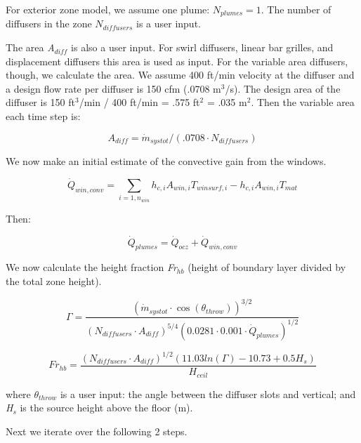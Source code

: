 For exterior zone model, we assume one plume: \({N_{plumes}} = 1\). The number of diffusers in the zone \({N_{diffusers}}\) is a user input.

The area \emph{A\(_{diff}\)} is also a user input. For swirl diffusers, linear bar grilles, and displacement diffusers this area is used as input. For the variable area diffusers, though, we calculate the area. We assume 400 ft/min velocity at the diffuser and a design flow rate per diffuser is 150 cfm (.0708 m\(^{3}\)/s). The design area of the diffuser is 150 ft\(^{3}\)/min / 400 ft/min = .575 ft\(^{2}\) = .035 m\(^{2}\). Then the variable area each time step is:

\begin{equation}
{A_{diff}} = {\dot m_{systot}}/(.0708\cdot {N_{diffusers}})
\end{equation}

We now make an initial estimate of the convective gain from the windows.

\begin{equation}
{\dot Q_{win,conv}} = \sum\limits_{i = 1,{n_{win}}} {{h_{c,i}}} {A_{win,i}}{T_{winsurf,i}} - {h_{c,i}}{A_{win,i}}{T_{mat}}
\end{equation}

Then:

\begin{equation}
{\dot Q_{plumes}} = {\dot Q_{ocz}} + {\dot Q_{win,conv}}
\end{equation}

We now calculate the height fraction \emph{Fr\(_{hb}\)} (height of boundary layer divided by the total zone height).

\begin{equation}
\Gamma  = \frac{{{{({{\dot m}_{systot}}\cdot \cos ({\theta_{throw}}))}^{3/2}}}}{{{{({N_{diffusers}}\cdot {A_{diff}})}^{5/4}}{{(0.0281\cdot 0.001\cdot {{\dot Q}_{plumes}})}^{1/2}}}}
\end{equation}

\begin{equation}
F{r_{hb}} = \frac{{{{({N_{diffusers}}\cdot {A_{diff}})}^{1/2}}(11.03ln(\Gamma ) - 10.73 + 0.5{H_s})}}{{{H_{ceil}}}}
\end{equation}

where \emph{\(\theta_{throw}\)} is a user input: the angle between the diffuser slots and vertical; and \emph{H\(_{s}\)} is the source height above the floor (m).

Next we iterate over the following 2 steps.

